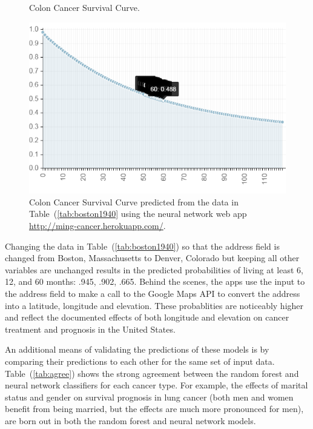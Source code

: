 \documentclass[a4paper,11pt]{article}
\begin{document}
\begin{figure}[!ht]
 \caption{Colon Cancer Survival Curve.}
  \label{fig:boston1940}
  \centering
    \includegraphics[scale=.5]{boston1940}
\caption{\label{fig:boston1940} Colon Cancer Survival Curve predicted from the data in 
Table~(\ref{tab:boston1940} using the neural network web app \url{http://ming-cancer.herokuapp.com/}.}
\end{figure}









Changing the data in Table~(\ref{tab:boston1940}) so that the address field is changed from Boston, Massachusetts to Denver, Colorado but keeping all other variables are unchanged results in the predicted probabilities of living at least 6, 12, and 60 months: .945, .902, .665. 
Behind the scenes, the apps use the input to the address field to make a call to the Google Maps API to convert the address into a latitude, longitude and elevation.
These probablities are noticeably higher and reflect the documented effects of both longitude and elevation on cancer treatment and prognosis in the United States.

An additional means of validating the predictions of these models is by comparing their predictions to each other for the same set of input data. 
Table~(\ref{tab:agree}) shows the strong agreement between the random forest and neural network classifiers for each cancer type. 
For example, the effects of marital status and gender on survival prognosis in lung cancer (both men and women benefit from being married, but the effects are much more pronounced for men), are born out in both the random forest and neural network models. 
\end{document}

